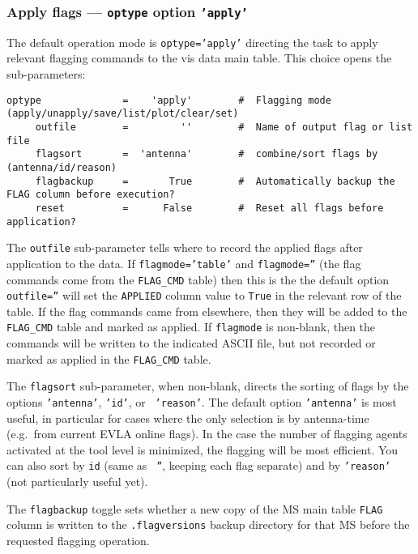 \subsubsection{Apply flags --- {\tt optype} option {\tt 'apply'}}
\label{section:edit.flagcmd.optype.apply}

The default operation mode is {\tt optype='apply'} directing the
task to apply relevant flagging commands to the vis data main table.
This choice opens the sub-parameters:
\small
\begin{verbatim}
optype              =    'apply'        #  Flagging mode (apply/unapply/save/list/plot/clear/set)
     outfile        =         ''        #  Name of output flag or list file
     flagsort       =  'antenna'        #  combine/sort flags by (antenna/id/reason)
     flagbackup     =       True        #  Automatically backup the FLAG column before execution?
     reset          =      False        #  Reset all flags before application?
\end{verbatim}
\normalsize

The {\tt outfile} sub-parameter tells where to record the applied
flags after application to the data.  If {\tt flagmode='table'} and 
{\tt flagmode=''} (the flag commands come from the {\tt FLAG\_CMD}
table) then this is the the default option {\tt outfile=''} will set
the {\tt APPLIED} column value to {\tt True} in the relevant row of
the table.  If the flag commands came from elsewhere, then they will
be added to the {\tt FLAG\_CMD} table and marked as applied. If
{\tt flagmode} is non-blank, then the commands will be written to the
indicated ASCII file, but not recorded or marked as applied in the
{\tt FLAG\_CMD} table.

The {\tt flagsort} sub-parameter, when non-blank, directs the sorting
of flags by the options {\tt 'antenna'}, {\tt 'id'}, or {\tt
  'reason'}.  The default option {\tt 'antenna'} is most useful, in
particular for cases where the only selection is by antenna-time
(e.g.\ from current EVLA online flags).  In the case the number of
flagging agents activated at the tool level is minimized, the flagging
will be most efficient.  You can also sort by {\tt id} (same as {\tt
  ''}, keeping each flag separate) and by {\tt 'reason'} (not
particularly useful yet).

The {\tt flagbackup} toggle sets whether a new copy of the MS main
table {\tt FLAG} column is written to the {\tt .flagversions} backup
directory for that MS before the requested flagging operation.

